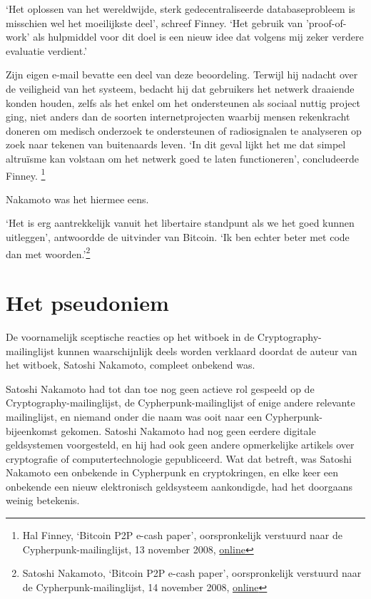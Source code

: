 \documentclass[
  a5paper,
  smalldemyvopaper,11pt,twoside,onecolumn,openright,extrafontsizes]{memoir}
\begin{document}
`Het oplossen van het wereldwijde, sterk gedecentraliseerde
databaseprobleem is misschien wel het moeilijkste deel', schreef Finney.
`Het gebruik van 'proof-of-work' als hulpmiddel voor dit doel is een
nieuw idee dat volgens mij zeker verdere evaluatie verdient.'

Zijn eigen e-mail bevatte een deel van deze beoordeling. Terwijl hij
nadacht over de veiligheid van het systeem, bedacht hij dat gebruikers
het netwerk draaiende konden houden, zelfs als het enkel om het
ondersteunen als sociaal nuttig project ging, niet anders dan de soorten
internetprojecten waarbij mensen rekenkracht doneren om medisch
onderzoek te ondersteunen of radiosignalen te analyseren op zoek naar
tekenen van buitenaards leven. `In dit geval lijkt het me dat simpel
altruïsme kan volstaan om het netwerk goed te laten functioneren',
concludeerde Finney. \footnote{Hal Finney, `Bitcoin P2P e-cash paper',
  oorspronkelijk verstuurd naar de Cypherpunk-mailinglijst, 13 november
  2008,
  \href{https://www.metzdowd.com/pipermail/cryptography/2008-November/014848.html}{online}}

Nakamoto was het hiermee eens.

`Het is erg aantrekkelijk vanuit het libertaire standpunt als we het
goed kunnen uitleggen', antwoordde de uitvinder van Bitcoin. `Ik ben
echter beter met code dan met woorden.'\footnote{Satoshi Nakamoto,
  `Bitcoin P2P e-cash paper', oorspronkelijk verstuurd naar de
  Cypherpunk-mailinglijst, 14 november 2008,
  \href{https://www.metzdowd.com/pipermail/cryptography/2008-November/014853.html}{online}}

\section{Het pseudoniem}\label{het-pseudoniem}

De voornamelijk sceptische reacties op het witboek in de
Cryptography-mailinglijst kunnen waarschijnlijk deels worden verklaard
doordat de auteur van het witboek, Satoshi Nakamoto, compleet onbekend
was.

Satoshi Nakamoto had tot dan toe nog geen actieve rol gespeeld op de
Cryptography-mailinglijst, de Cypherpunk-mailinglijst of enige andere
relevante mailinglijst, en niemand onder die naam was ooit naar een
Cypherpunk-bijeenkomst gekomen. Satoshi Nakamoto had nog geen eerdere
digitale geldsystemen voorgesteld, en hij had ook geen andere
opmerkelijke artikels over cryptografie of computertechnologie
gepubliceerd. Wat dat betreft, was Satoshi Nakamoto een onbekende in
Cypherpunk en cryptokringen, en elke keer een onbekende een nieuw
elektronisch geldsysteem aankondigde, had het doorgaans weinig
betekenis.
\end{document}
